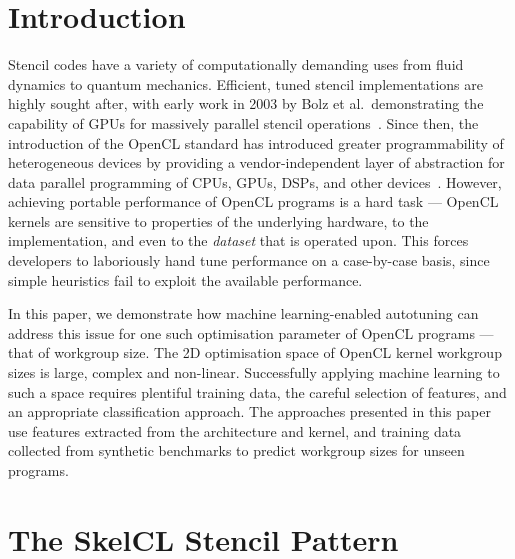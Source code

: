 \documentclass[preprint,nonatbib,10pt]{sigplanconf}
\begin{document}



\section{Introduction}\label{sec:introduction}

Stencil codes have a variety of computationally demanding uses from
fluid dynamics to quantum mechanics. Efficient, tuned stencil
implementations are highly sought after, with early work in 2003 by
Bolz et al.\ demonstrating the capability of GPUs for massively
parallel stencil operations~\cite{Bolz2003}. Since then, the
introduction of the OpenCL standard has introduced greater
programmability of heterogeneous devices by providing a
vendor-independent layer of abstraction for data parallel programming
of CPUs, GPUs, DSPs, and other devices~\cite{Stone2010}. However,
achieving portable performance of OpenCL programs is a hard task ---
OpenCL kernels are sensitive to properties of the underlying hardware,
to the implementation, and even to the \emph{dataset} that is operated
upon. This forces developers to laboriously hand tune performance on a
case-by-case basis, since simple heuristics fail to exploit the
available performance.

In this paper, we demonstrate how machine learning-enabled autotuning
can address this issue for one such optimisation parameter of OpenCL
programs --- that of workgroup size. The 2D optimisation space of
OpenCL kernel workgroup sizes is large, complex and
non-linear. Successfully applying machine learning to such a space
requires plentiful training data, the careful selection of features,
and an appropriate classification approach. The approaches presented
in this paper use features extracted from the architecture and kernel,
and training data collected from synthetic benchmarks to predict
workgroup sizes for unseen programs.


\section{The SkelCL Stencil Pattern}
\end{document}
